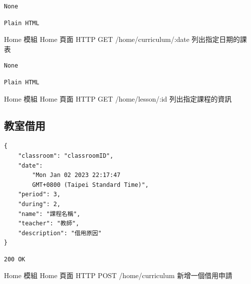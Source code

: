 \documentclass{article}
\begin{document}
\bigskip

\begin{lrbox}{\jsoninputbox}
	\begin{lstlisting}
None
\end{lstlisting}
\end{lrbox}

\begin{lrbox}{\jsonoutputbox}
	\begin{lstlisting}
Plain HTML
\end{lstlisting}
\end{lrbox}

{Home 模組}
{Home 頁面}
{HTTP GET}
{/home/curriculum/:date}
{列出指定日期的課表}

\bigskip

\begin{lrbox}{\jsoninputbox}
	\begin{lstlisting}
None
\end{lstlisting}
\end{lrbox}

\begin{lrbox}{\jsonoutputbox}
	\begin{lstlisting}
Plain HTML
\end{lstlisting}
\end{lrbox}

{Home 模組}
{Home 頁面}
{HTTP GET}
{/home/lesson/:id}
{列出指定課程的資訊}

\pagebreak

\subsection{教室借用}

\begin{lrbox}{\jsoninputbox}
	\begin{lstlisting}[basicstyle=\tiny\ttfamily]
{
	"classroom": "classroomID",
	"date":
		"Mon Jan 02 2023 22:17:47
		GMT+0800 (Taipei Standard Time)",
	"period": 3,
	"during": 2,
	"name": "課程名稱",
	"teacher": "教師",
	"description": "借用原因"
}
\end{lstlisting}
\end{lrbox}

\begin{lrbox}{\jsonoutputbox}
	\begin{lstlisting}
200 OK
\end{lstlisting}
\end{lrbox}

{Home 模組}
{Home 頁面}
{HTTP POST}
{/home/curriculum}
{新增一個借用申請}
\end{document}
